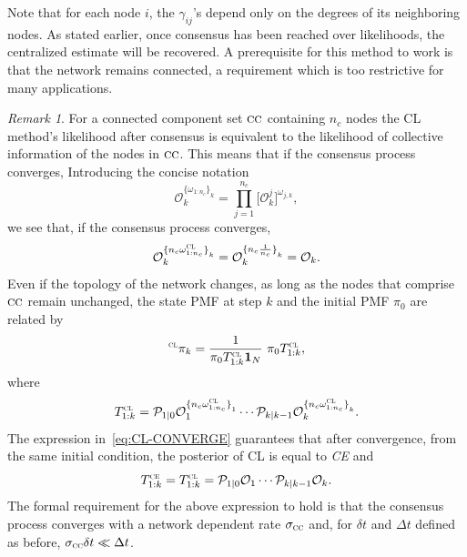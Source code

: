 \documentclass[journal]{IEEEtran}
\theoremstyle{remark}
\newtheorem{remark}{Remark}
\newcommand{\suf}[1]{\textsc{\tiny #1}}  %
\theoremstyle{definition}
\begin{document}
Note that for each node $i$, the $\gamma_{ij}$'s depend only on the degrees of
its neighboring nodes. As stated earlier, once consensus has been reached over
likelihoods, the centralized estimate will be recovered. A prerequisite for
this method to work is that the network remains connected, a 
requirement which is too restrictive for many applications.

\begin{remark}
For a connected component set $\textsc{cc}$ containing $n_{c}$ nodes
the CL method's likelihood after consensus is equivalent to the likelihood of collective information of the nodes in $\textsc{cc}$. This means that if the consensus process converges,
Introducing the concise notation 
\begin{equation}
\mathcal{O}_{k}^{{\{\omega_{1:n_{c}}\}}_{k}} = \prod_{j = 1}^{n_{c}}  \big[\mathcal{O}_k^j]^{\omega_{j,k}},
\end{equation} 
we see that, if the consensus process converges,
\begin{equation}
\mathcal{O}_{k}^{{\{n_c\omega_{1:n_{c}}^{\suf{CL}}\}}_{k}}= \mathcal{O}_{k}^{{\{n_c\frac{1}{n_c}\}}_{k}} = \mathcal{O}_{k}.
\label{eq:CL-CONVERGE} 
\end{equation}
Even if the topology of the network changes, as long as the nodes that comprise $\textsc{cc}$ remain unchanged, the state PMF at step $k$ and the initial PMF $\pi_{0}$ are related by
\begin{equation}
{}^{\suf{CL}}{\pi}_{k} = \frac{1}{{\pi}_{0}T_{1:k}^{\suf{CL}}\mathbf{1}_N}\,\,{\pi_{0}}T_{1:k}^{\suf{CL}} 
,\label{CL-UPDATE} 
\end{equation}
where  
\begin{equation}
\label{CL-INC}
{T}_{1:k}^{\suf{CL}}  =\mathcal{P}_{1\vert0}\mathcal{O}_{1}^{{\{n_c\omega_{1:n_{c}}^{\suf{CL}}\}}_{1}}\cdots\mathcal{P}_{k\vert k-1}\mathcal{O}_{k}^{{\{n_c\omega_{1:n_{c}}^{\suf{CL}}\}}_{k}}. 
\end{equation}
The expression in~\eqref{eq:CL-CONVERGE} guarantees that after convergence,
from the same initial condition, the posterior of CL is equal to
\emph{CE} and 
\begin{equation} \label{TCL}
{T}_{1:k}^{\suf{CE}} = {T}_{1:k}^{\suf{CL}}  =\mathcal{P}_{1\vert0}\mathcal{O}_{1}\cdots\mathcal{P}_{k\vert k-1}\mathcal{O}_{k}.
\end{equation}
The formal requirement for the above expression to hold is that the consensus
process converges with a network dependent rate $\sigma_{\textsc{cc}}$ and, for
$\delta t$ and $\Delta t$ defined as before, $\sigma_{\textsc{cc}}\delta t \ll
\Delta t$.
\end{remark}
\end{document}
